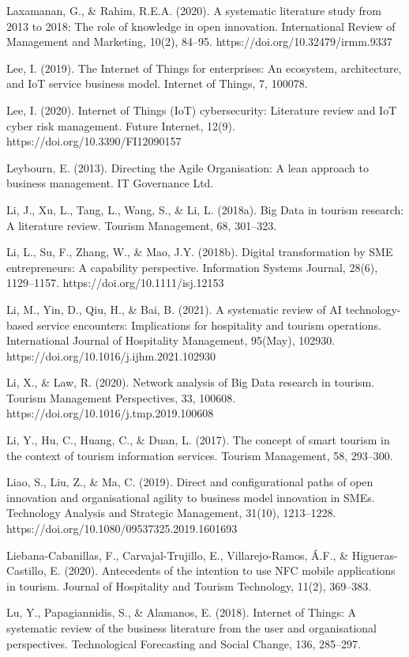 \documentclass[
  letterpaper,
  DIV=11,
  numbers=noendperiod]{scrreprt}
\begin{document}
Laxamanan, G., \& Rahim, R.E.A. (2020). A systematic literature study
from 2013 to 2018: The role of knowledge in open innovation.
International Review of Management and Marketing, 10(2), 84--95.
https://doi.org/10.32479/irmm.9337

Lee, I. (2019). The Internet of Things for enterprises: An ecosystem,
architecture, and IoT service business model. Internet of Things, 7,
100078.

Lee, I. (2020). Internet of Things (IoT) cybersecurity: Literature
review and IoT cyber risk management. Future Internet, 12(9).
https://doi.org/10.3390/FI12090157

Leybourn, E. (2013). Directing the Agile Organisation: A lean approach
to business management. IT Governance Ltd.

Li, J., Xu, L., Tang, L., Wang, S., \& Li, L. (2018a). Big Data in
tourism research: A literature review. Tourism Management, 68, 301--323.

Li, L., Su, F., Zhang, W., \& Mao, J.Y. (2018b). Digital transformation
by SME entrepreneurs: A capability perspective. Information Systems
Journal, 28(6), 1129--1157. https://doi.org/10.1111/isj.12153

Li, M., Yin, D., Qiu, H., \& Bai, B. (2021). A systematic review of AI
technology-based service encounters: Implications for hospitality and
tourism operations. International Journal of Hospitality Management,
95(May), 102930. https://doi.org/10.1016/j.ijhm.2021.102930

Li, X., \& Law, R. (2020). Network analysis of Big Data research in
tourism. Tourism Management Perspectives, 33, 100608.
https://doi.org/10.1016/j.tmp.2019.100608

Li, Y., Hu, C., Huang, C., \& Duan, L. (2017). The concept of smart
tourism in the context of tourism information services. Tourism
Management, 58, 293--300.

Liao, S., Liu, Z., \& Ma, C. (2019). Direct and configurational paths of
open innovation and organisational agility to business model innovation
in SMEs. Technology Analysis and Strategic Management, 31(10),
1213--1228. https://doi.org/10.1080/09537325.2019.1601693

Liebana-Cabanillas, F., Carvajal-Trujillo, E., Villarejo-Ramos, Á.F., \&
Higueras-Castillo, E. (2020). Antecedents of the intention to use NFC
mobile applications in tourism. Journal of Hospitality and Tourism
Technology, 11(2), 369--383.

Lu, Y., Papagiannidis, S., \& Alamanos, E. (2018). Internet of Things: A
systematic review of the business literature from the user and
organisational perspectives. Technological Forecasting and Social
Change, 136, 285--297.
\end{document}
